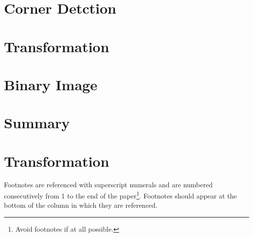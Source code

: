 \documentclass[twocolumn,10pt]{asme2ej}
\begin{document}
\section{Corner Detction}


\section{Transformation}

\section{Binary Image}


\section{Summary}
















\section{Transformation}

Footnotes are referenced with superscript numerals and are numbered consecutively from 1 to the end of the paper\footnote{Avoid footnotes if at all possible.}. Footnotes should appear at the bottom of the column in which they are referenced.
\end{document}
